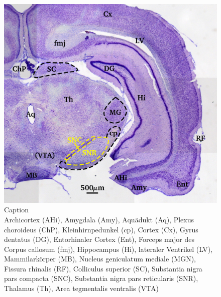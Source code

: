 \documentclass[12pt,a4paper,pdftex]{article}
\begin{document}
\begin{figure}[H]
    \centering
    \includegraphics{pictures/Basalganglia/SN.png}
    \caption{Caption\\
    Archicortex (AHi), Amygdala (Amy), Aquädukt (Aq), Plexus choroideus (ChP), Kleinhirnpedunkel (cp), Cortex (Cx), Gyrus dentatus (DG), Entorhinaler Cortex (Ent), Forceps major des Corpus callosum (fmj), Hippocampus (Hi), lateraler Ventrikel (LV), Mammilarkörper (MB), Nucleus geniculatum mediale (MGN), Fissura rhinalis (RF), Colliculus superior (SC), Substantia nigra pars compacta (SNC), Substantia nigra pars reticularis (SNR), Thalamus (Th), Area tegmentalis ventralis (VTA)}
    \label{fig:SN_Basalganglia}
\end{figure}
\end{document}
